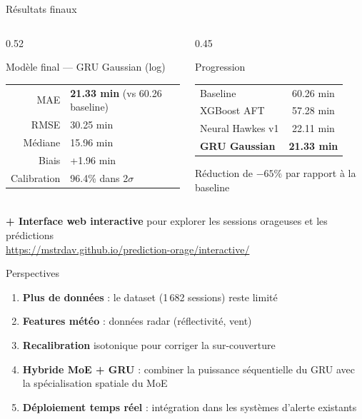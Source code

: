 \documentclass[aspectratio=169,10pt]{beamer}
\newcommand{\hig}[1]{\textcolor{meteoRed}{\textbf{#1}}}
\begin{document}
\begin{frame}{Résultats finaux}
\begin{columns}[T]
\begin{column}{0.52\textwidth}
\begin{block}{Modèle final — GRU Gaussian (log)}
\begin{tabular}{@{}rl@{}}
MAE          & \hig{21.33 min} (vs 60.26 baseline) \\
RMSE         & 30.25 min \\
Médiane      & 15.96 min \\
Biais        & +1.96 min \\
Calibration  & 96.4\% dans 2$\sigma$ \\
\end{tabular}
\end{block}
\end{column}
\begin{column}{0.45\textwidth}
\begin{block}{Progression}
\centering
\begin{tabular}{@{}lc@{}}
Baseline     & 60.26 min \\
XGBoost AFT  & 57.28 min \\
Neural Hawkes v1 & 22.11 min \\
\textbf{GRU Gaussian} & \textbf{21.33 min} \\
\end{tabular}

\vspace{0.5em}
\small Réduction de \hig{$-65\%$} par rapport à la baseline
\end{block}
\end{column}
\end{columns}

\vspace{0.8em}
\centering
\textbf{+ Interface web interactive} pour explorer les sessions orageuses et les prédictions\\
\small\url{https://mstrdav.github.io/prediction-orage/interactive/}
\end{frame}


\begin{frame}{Perspectives}
\begin{enumerate}
  \item \textbf{Plus de données} : le dataset (1\,682 sessions) reste limité
  \item \textbf{Features météo} : données radar (réflectivité, vent)
  \item \textbf{Recalibration} isotonique pour corriger la sur-couverture
  \item \textbf{Hybride MoE + GRU} : combiner la puissance séquentielle du GRU avec la spécialisation spatiale du MoE
  \item \textbf{Déploiement temps réel} : intégration dans les systèmes d'alerte existants
\end{enumerate}
\end{frame}
\end{document}
